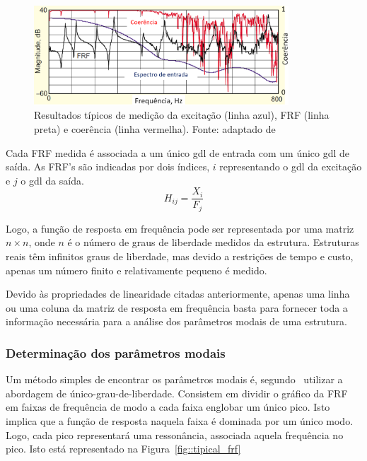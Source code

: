 \begin{figure}[h]
	\centering 
 	\includegraphics[width=0.85\textwidth]{figs/coerencia}
 	\caption[Resultados típicos de medição da excitação, FRF e
 	coerência]{Resultados típicos de medição da excitação (linha azul), FRF
 	(linha preta) e coerência (linha vermelha).	Fonte: adaptado de
 	\cite{avitabile2001experimental}}
 	\label{fig::coerencia}
\end{figure}

Cada FRF medida é associada a um único gdl de entrada com um único gdl de saída.
As FRF's são indicadas por dois índices, $i$ representando o gdl da excitação e
$j$ o gdl da saída.
%
\begin{equation}
	H_{ij} = \frac{X_i}{F_j}
\end{equation}

Logo, a função de resposta em frequência pode ser representada por uma matriz $n
\times n$, onde $n$ é o número de graus de liberdade medidos da estrutura.
Estruturas reais têm infinitos graus de liberdade, mas devido a restrições de
tempo e custo, apenas um número finito e relativamente pequeno é medido.

Devido às propriedades de linearidade citadas anteriormente, apenas uma linha ou
uma coluna da matriz de resposta em frequência basta para fornecer toda a
informação necessária para a análise dos parâmetros modais de uma estrutura.


\subsubsection{Determinação dos parâmetros modais}

Um método simples de encontrar os parâmetros modais é,
segundo~\citet{rao2011mechanical} utilizar a abordagem de
único-grau-de-liberdade. Consistem em dividir o gráfico da FRF em faixas de
frequência de modo a cada faixa englobar um único pico. Isto implica que a
função de resposta naquela faixa é dominada por um único modo. Logo, cada pico
representará uma ressonância, associada aquela frequência no pico. Isto está
representado na Figura~\ref{fig::tipical_frf}

